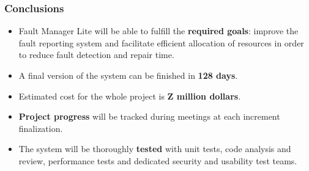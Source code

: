 \documentclass[10pt, compress,usetitleprogressbar,aspectratio=1610]{beamer}
\begin{document}
\begin{frame}
\frametitle{Conclusions}

\begin{itemize}
\item Fault Manager Lite will be able to fulfill the \textbf{required goals}: improve the fault reporting system and facilitate efficient allocation of resources in order to reduce fault detection and repair time.
\item A final version of the system can be finished in \textbf{128 days}.
\item Estimated cost for the whole project is \textbf{Z million dollars}.
\item \textbf{Project progress} will be tracked during meetings at each increment finalization.
\item The system will be thoroughly \textbf{tested} with unit tests, code analysis and review, performance tests and dedicated security and usability test teams.
\end{itemize}

\end{frame}

\end{document}
